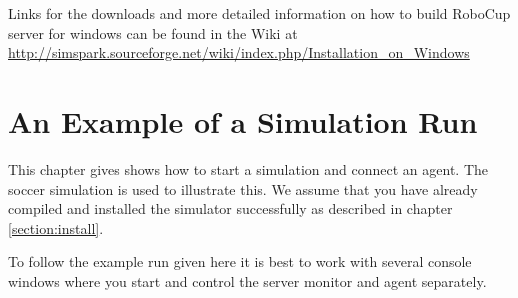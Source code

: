 Links for the downloads and more detailed information on how to build RoboCup
server for windows can be found in the Wiki at
\url{http://simspark.sourceforge.net/wiki/index.php/Installation_on_Windows}


\section{An Example of a Simulation Run}

This chapter gives shows how to start a simulation and connect an
agent. The soccer simulation is used to illustrate this. We assume
that you have already compiled and installed the simulator successfully
as described in chapter \ref{section:install}. 

To follow the example run given here it is best to work with several
console windows where you start and control the server monitor and
agent separately.

